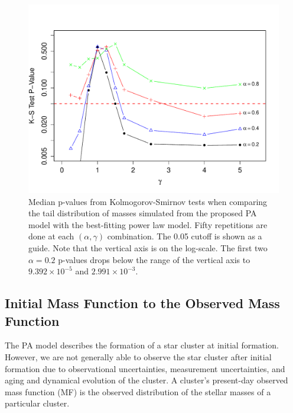 \documentclass[ejs]{imsart}
\numberwithin{equation}{section}
\theoremstyle{plain}
\begin{document}
\begin{figure}[htbp]
   \centering
\includegraphics[width = \textwidth]{figures/KSpowerlaw_1000_1.pdf}
\caption{Median p-values from Kolmogorov-Smirnov tests when comparing the tail distribution of masses simulated from
the proposed PA model with the best-fitting power law model. Fifty repetitions are done at each $(\alpha, \gamma)$
combination. The 0.05 cutoff is shown as a guide. Note that the vertical axis is on the log-scale.
The first two $\alpha = 0.2$ p-values drops below the range of the vertical axis to $9.392\times10^{-5}$ and $2.991\times10^{-3}$.
}
   \label{fig:KSpowerlaw1000}
\end{figure}



\subsection{Initial Mass Function to the Observed Mass Function} \label{sec:obs_challenges}
The PA model describes the formation of a star cluster at initial formation.  However, we are not generally able to observe the star cluster after initial formation due to observational uncertainties, measurement uncertainties, and aging and dynamical evolution of the cluster.  A cluster's present-day observed mass function (MF) is the observed distribution of the stellar masses of a particular cluster.
\end{document}
